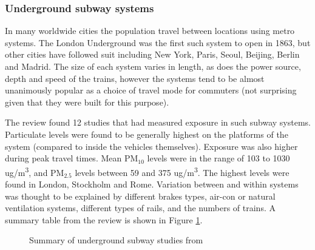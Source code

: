 
\subsubsection{Underground subway systems}
\label{sec:underground}


In many worldwide cities the population travel between locations using metro systems. The London Underground was the first such system to open in 1863, but other cities have followed suit including New York, Paris, Seoul, Beijing, Berlin and Madrid. The size of each system varies in length, as does the power source, depth and speed of the trains, however the systems tend to be almost unanimously popular as a choice of travel mode for commuters (not surprising given that they were built for this purpose).

The \cite{Karanasiou2014} review found 12 studies that had measured exposure in such subway systems. Particulate levels were found to be generally highest on the platforms of the system (compared to inside the vehicles themselves). Exposure was also higher during peak travel times. Mean PM$_{10}$ levels were in the range of 103 to 1030 ug/m\textsuperscript{3}, and PM$_{2.5}$ levels between 59 and 375 ug/m\textsuperscript{3}. The highest levels were found in London, Stockholm and Rome. Variation between and within systems was thought to be explained by different brakes types, air-con or natural ventilation systems, different types of rails, and the numbers of trains. A summary table from the review is shown in Figure \ref{fig:pm_tube_summary}.

\begin{landscape}
\begin{figure}[H]
\centering
{}
\caption{Summary of underground subway studies from \cite{Karanasiou2014}}
\label{fig:pm_tube_summary}
\end{figure}
\end{landscape}

